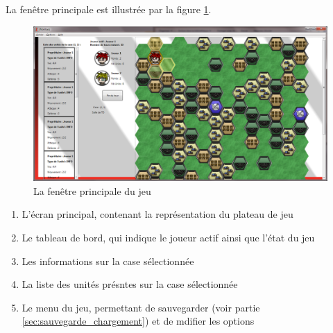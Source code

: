 La fenêtre principale est illustrée par la figure \ref{fig:fen_princ}.

\begin{figure}[!h]
\centering
\includegraphics[width=\textwidth]{Parties/Images/EcranPrincipal.png}
\caption{La fenêtre principale du jeu}
\label{fig:fen_princ}
\end{figure}

\begin{enumerate}
\item L'écran principal, contenant la représentation du plateau de jeu
\item Le tableau de bord, qui indique le joueur actif ainsi que l'état du jeu
\item Les informations sur la case sélectionnée
\item La liste des unités présntes sur la case sélectionnée
\item Le menu du jeu, permettant de sauvegarder (voir partie \ref{sec:sauvegarde_chargement}) et de mdifier les options
\end{enumerate}